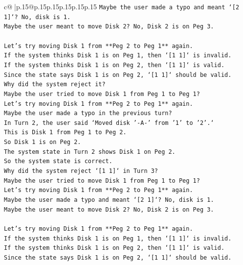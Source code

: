 \documentclass{article}
\begin{document}
{\begin{supertabular}{c@{$\;$}|p{.15\linewidth}@{}p{.15\linewidth}p{.15\linewidth}p{.15\linewidth}p{.15\linewidth}p{.15\linewidth}}
{{{\texttt{Maybe the user made a typo and meant `{[}2 1{]}`? No, disk is 1.} \\
\texttt{Maybe the user meant to move Disk 2? No, Disk 2 is on Peg 3.} \\
\\ 
\texttt{Let's try moving Disk 1 from **Peg 2 to Peg 1** again.} \\
\texttt{If the system thinks Disk 1 is on Peg 1, then `{[}1 1{]}` is invalid.} \\
\texttt{If the system thinks Disk 1 is on Peg 2, then `{[}1 1{]}` is valid.} \\
\texttt{Since the state says Disk 1 is on Peg 2, `{[}1 1{]}` should be valid.} \\
\texttt{Why did the system reject it?} \\
\texttt{Maybe the user tried to move Disk 1 from Peg 1 to Peg 1?} \\
\texttt{Let's try moving Disk 1 from **Peg 2 to Peg 1** again.} \\
\texttt{Maybe the user made a typo in the previous turn?} \\
\texttt{In Turn 2, the user said `Moved disk '{-}A{-}' from '1' to '2'.`} \\
\texttt{This is Disk 1 from Peg 1 to Peg 2.} \\
\texttt{So Disk 1 is on Peg 2.} \\
\texttt{The system state in Turn 2 shows Disk 1 on Peg 2.} \\
\texttt{So the system state is correct.} \\
\texttt{Why did the system reject `{[}1 1{]}` in Turn 3?} \\
\texttt{Maybe the user tried to move Disk 1 from Peg 1 to Peg 1?} \\
\texttt{Let's try moving Disk 1 from **Peg 2 to Peg 1** again.} \\
\texttt{Maybe the user made a typo and meant `{[}2 1{]}`? No, disk is 1.} \\
\texttt{Maybe the user meant to move Disk 2? No, Disk 2 is on Peg 3.} \\
\\ 
\texttt{Let's try moving Disk 1 from **Peg 2 to Peg 1** again.} \\
\texttt{If the system thinks Disk 1 is on Peg 1, then `{[}1 1{]}` is invalid.} \\
\texttt{If the system thinks Disk 1 is on Peg 2, then `{[}1 1{]}` is valid.} \\
\texttt{Since the state says Disk 1 is on Peg 2, `{[}1 1{]}` should be valid.} \\
}}}
\end{supertabular}}
\end{document}
